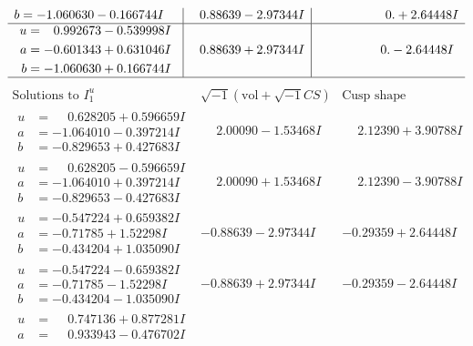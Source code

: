 \documentclass[1p]{elsarticle_modified}
\theoremstyle{definition}
\newcommand{\I}{\sqrt{-1}}
\begin{document}
$$\begin{array}{c|c|c}
\begin{aligned}
b &= -1.060630 - 0.166744 I\end{aligned}
 & \phantom{-}0.88639 - 2.97344 I & \phantom{-0.000000 -}0. + 2.64448 I \\ \hline\begin{aligned}
u &= \phantom{-}0.992673 - 0.539998 I \\
a &= -0.601343 + 0.631046 I \\
b &= -1.060630 + 0.166744 I\end{aligned}
 & \phantom{-}0.88639 + 2.97344 I & \phantom{-0.000000 } 0. - 2.64448 I\\
 \hline 
 \end{array}$$\newpage$$\begin{array}{c|c|c}  
\text{Solutions to }I^u_{1}& \I (\text{vol} + \sqrt{-1}CS) & \text{Cusp shape}\\
 \hline 
\begin{aligned}
u &= \phantom{-}0.628205 + 0.596659 I \\
a &= -1.064010 - 0.397214 I \\
b &= -0.829653 + 0.427683 I\end{aligned}
 & \phantom{-}2.00090 - 1.53468 I & \phantom{-}2.12390 + 3.90788 I \\ \hline\begin{aligned}
u &= \phantom{-}0.628205 - 0.596659 I \\
a &= -1.064010 + 0.397214 I \\
b &= -0.829653 - 0.427683 I\end{aligned}
 & \phantom{-}2.00090 + 1.53468 I & \phantom{-}2.12390 - 3.90788 I \\ \hline\begin{aligned}
u &= -0.547224 + 0.659382 I \\
a &= -0.71785 + 1.52298 I \\
b &= -0.434204 + 1.035090 I\end{aligned}
 & -0.88639 - 2.97344 I & -0.29359 + 2.64448 I \\ \hline\begin{aligned}
u &= -0.547224 - 0.659382 I \\
a &= -0.71785 - 1.52298 I \\
b &= -0.434204 - 1.035090 I\end{aligned}
 & -0.88639 + 2.97344 I & -0.29359 - 2.64448 I \\ \hline\begin{aligned}
u &= \phantom{-}0.747136 + 0.877281 I \\
a &= \phantom{-}0.933943 - 0.476702 I \\

\end{aligned}
\end{array}$$
\end{document}
